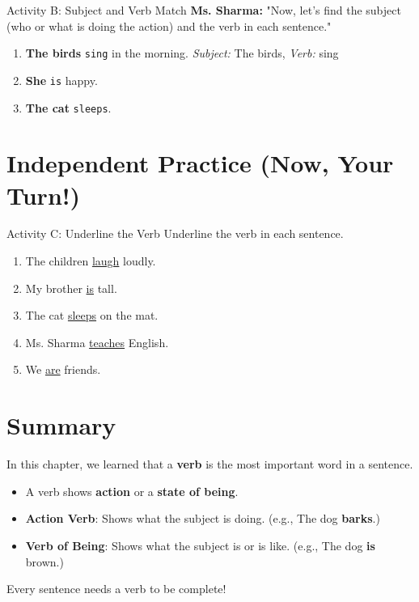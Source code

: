 \begin{activitybox}{Activity B: Subject and Verb Match}
\textbf{Ms. Sharma:} "Now, let's find the subject (who or what is doing the action) and the verb in each sentence."
\begin{enumerate}
    \item \textbf{The birds} \texttt{sing} in the morning.
    \textit{Subject:} The birds, \textit{Verb:} sing
    \item \textbf{She} \texttt{is} happy.
    \item \textbf{The cat} \texttt{sleeps}.
\end{enumerate}
\end{activitybox}

\section{Independent Practice (Now, Your Turn!)}
\begin{activitybox}{Activity C: Underline the Verb}
Underline the verb in each sentence.
\begin{enumerate}
    \item The children \underline{laugh} loudly.
    \item My brother \underline{is} tall.
    \item The cat \underline{sleeps} on the mat.
    \item Ms. Sharma \underline{teaches} English.
    \item We \underline{are} friends.
\end{enumerate}
\end{activitybox}

\section{Summary}
\begin{summarybox}
In this chapter, we learned that a \textbf{verb} is the most important word in a sentence.
\begin{itemize}
    \item A verb shows \textbf{action} or a \textbf{state of being}.
    \item \textbf{Action Verb}: Shows what the subject is doing. (e.g., The dog \textbf{barks}.)
    \item \textbf{Verb of Being}: Shows what the subject is or is like. (e.g., The dog \textbf{is} brown.)
\end{itemize}
Every sentence needs a verb to be complete!
\end{summarybox}